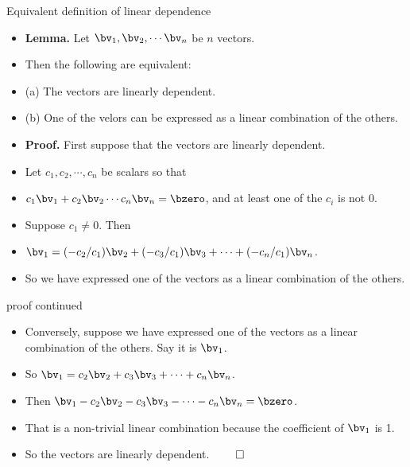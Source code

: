 \documentclass{beamer}
\begin{document}
\begin{frame}{Equivalent definition of linear dependence}

\begin{itemize}
\item \textbf{Lemma.} Let $\bv_1,\bv_2,\cdots\bv_n$ be $n$ vectors.
\item Then the following are equivalent:
\item (a) The vectors are linearly dependent.
\item (b) One of the velors can be expressed as a linear combination of the others.
\item \textbf{Proof.} First suppose that the vectors are linearly dependent.
\item Let $c_1,c_2,\cdots,c_n$ be scalars so that
\item $c_1\bv_1+c_2\bv_2\cdots c_n\bv_n = \bzero$, and at least one of the $c_i$ is not 0.
\item Suppose $c_1\not=0$. Then
\item $\bv_1 = (-c_2/c_1)\bv_2 + (-c_3/c_1)\bv_3 + \cdots + (-c_n/c_1)\bv_n$.
\item So we have expressed one of the vectors as a linear combination of the others.
\end{itemize}

\end{frame}


\begin{frame}{proof continued}

\begin{itemize}
\item Conversely, suppose we have expressed one of the vectors as a linear combination
of the others. Say it is $\bv_1$.
\item So $\bv_1 = c_2\bv_2 + c_3\bv_3 + \cdots + c_n \bv_n$.
\item Then $\bv_1 - c_2\bv_2 - c_3\bv_3 - \cdots - c_n\bv_n = \bzero$.
\item That is a non-trivial linear combination because the coefficient of $\bv_1$ is 1.
\item So the vectors are linearly dependent. $\qed$

\end{itemize}

\end{frame}

\end{document}
